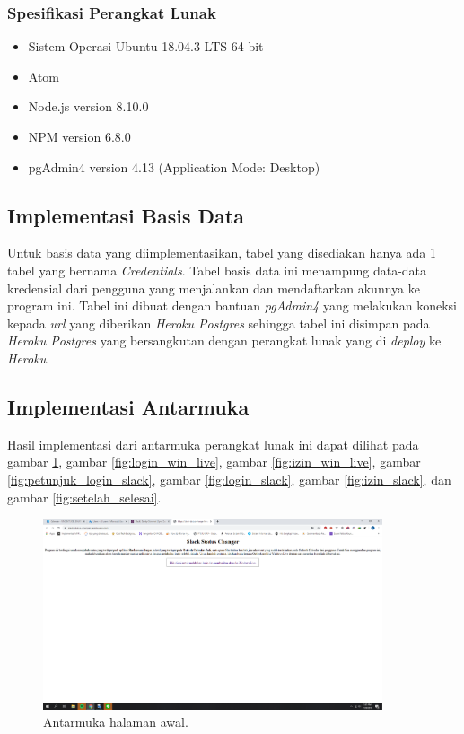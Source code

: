 \subsubsection{Spesifikasi Perangkat Lunak}
\begin{itemize}
    \item Sistem Operasi Ubuntu 18.04.3 LTS 64-bit
    \item Atom
    \item Node.js version 8.10.0
    \item NPM version 6.8.0
    \item pgAdmin4 version 4.13 (Application Mode: Desktop)
\end{itemize}

\subsection{Implementasi Basis Data}
Untuk basis data yang diimplementasikan, tabel yang disediakan hanya ada 1 tabel yang bernama \textit{Credentials}. Tabel basis data ini menampung data-data kredensial dari pengguna yang menjalankan dan mendaftarkan akunnya ke program ini. Tabel ini dibuat dengan bantuan \textit{pgAdmin4} yang melakukan koneksi kepada \textit{url} yang diberikan \textit{Heroku Postgres} sehingga tabel ini disimpan pada \textit{Heroku Postgres} yang bersangkutan dengan perangkat lunak yang di \textit{deploy} ke \textit{Heroku}. 

\subsection{Implementasi Antarmuka}
Hasil implementasi dari antarmuka perangkat lunak ini dapat dilihat pada gambar \ref{fig:antarmuka_awal}, gambar \ref{fig:login_win_live}, gambar \ref{fig:izin_win_live}, gambar \ref{fig:petunjuk_login_slack}, gambar \ref{fig:login_slack}, gambar \ref{fig:izin_slack}, dan gambar \ref{fig:setelah_selesai}. 

\begin{figure}[h]
  \includegraphics[width=10cm]{./Gambar/Step1.png}
  \centering
  \caption{Antarmuka halaman awal.}
  \label{fig:antarmuka_awal}
\end{figure}


